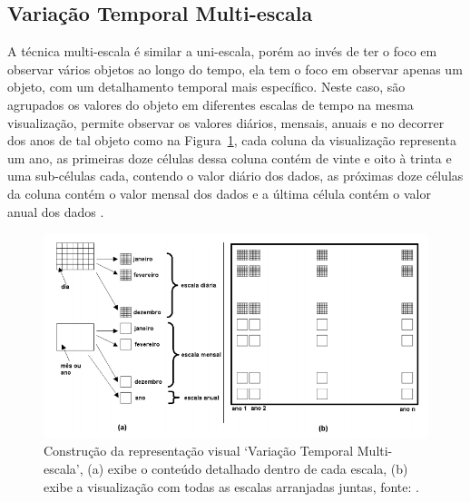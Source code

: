 \documentclass[article,11pt,oneside,a4paper]{abntex2} %
\begin{document}
	\subsection{Variação Temporal Multi-escala}
		\hspace{13pt}
	A técnica multi-escala é similar a uni-escala, porém ao invés de ter o foco em observar vários objetos ao longo do tempo, ela tem o foco em observar apenas um objeto, com um detalhamento temporal mais específico. Neste caso, são agrupados os valores do objeto em diferentes escalas de tempo na mesma visualização, permite observar os valores diários, mensais, anuais e no decorrer dos anos de tal objeto como na Figura~\ref{fig_multi}, cada coluna da visualização representa um ano, as primeiras doze células dessa coluna contém de vinte e oito à trinta e uma sub-células cada, contendo o valor diário dos dados, as próximas doze células da coluna contém o valor mensal dos dados e a última célula contém o valor anual dos dados \cite{shimabukuro}. 
	
	\begin{figure}[!h]
		{\centering
			\includegraphics[width=1\textwidth]{figuras/multi.png}
			\caption{Construção da representação visual `Variação Temporal Multi-escala', (a) exibe o conteúdo detalhado dentro de cada escala, (b) exibe a visualização com todas as escalas arranjadas juntas, fonte: \cite{shimabukuro}.}
			\label{fig_multi}
		}
	\end{figure}
\end{document}
